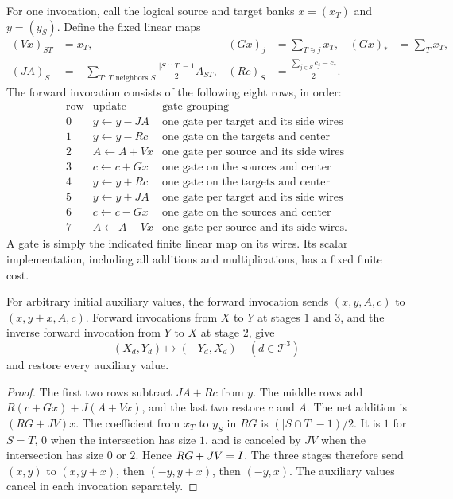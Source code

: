 For one invocation, call the logical source and target banks
$x=(x_T)$ and $y=(y_S)$.  Define the fixed linear maps
\begin{align*}
 (Vx)_{ST}&=x_T,&
 (Gx)_j&=\sum_{T\ni j}x_T,& (Gx)_*&=\sum_Tx_T,\\
 (JA)_S&=-\sum_{T:\,T\text{ neighbors }S}
                  \frac{|S\cap T|-1}{2}A_{ST},&
 (Rc)_S&=\frac{\sum_{j\in S}c_j-c_*}{2}.
\end{align*}
The forward invocation consists of the following eight rows, in order:
\begin{equation}\label{net:schedule}
\begin{array}{c|l|l}
 \text{row}&\text{update}&\text{gate grouping}\\\hline
 0&y\gets y-JA&\text{one gate per target and its side wires}\\
 1&y\gets y-Rc&\text{one gate on the targets and center}\\
 2&A\gets A+Vx&\text{one gate per source and its side wires}\\
 3&c\gets c+Gx&\text{one gate on the sources and center}\\
 4&y\gets y+Rc&\text{one gate on the targets and center}\\
 5&y\gets y+JA&\text{one gate per target and its side wires}\\
 6&c\gets c-Gx&\text{one gate on the sources and center}\\
 7&A\gets A-Vx&\text{one gate per source and its side wires}.
\end{array}
\end{equation}
A gate is simply the indicated finite linear map on its wires.  Its
scalar implementation, including all additions and multiplications,
has a fixed finite cost.

\begin{lemma}\label{net:scalar}
For arbitrary initial auxiliary values, the forward invocation sends
$(x,y,A,c)$ to $(x,y+x,A,c)$.  Forward invocations from $X$ to $Y$
at stages $1$ and $3$, and the inverse forward invocation from $Y$
to $X$ at stage $2$, give
\[
 (X_d,Y_d)\longmapsto(-Y_d,X_d)
 \quad(d\in\mathcal T^3)
\]
and restore every auxiliary value.
\end{lemma}

\begin{proof}
The first two rows subtract $JA+Rc$ from $y$.  The middle rows add
$R(c+Gx)+J(A+Vx)$, and the last two restore $c$ and $A$.  The net
addition is $(RG+JV)x$.  The coefficient from $x_T$ to $y_S$ in
$RG$ is $(|S\cap T|-1)/2$.  It is $1$ for $S=T$, $0$ when the
intersection has size $1$, and is canceled by $JV$ when the
intersection has size $0$ or $2$.  Hence $RG+JV=I$.
The three stages therefore send
$(x,y)$ to $(x,y+x)$, then $(-y,y+x)$, then $(-y,x)$.
The auxiliary values cancel in each invocation separately.
\end{proof}

